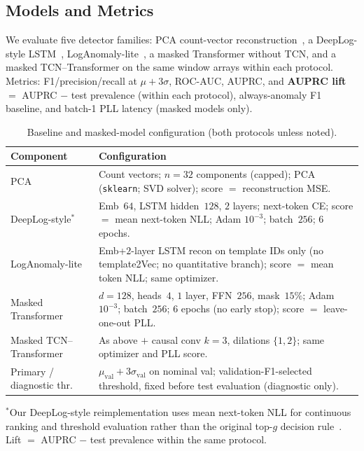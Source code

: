 \documentclass[a4paper]{llncs}
\renewcommand{\arraystretch}{0.95}
\begin{document}
\subsection{Models and Metrics}
We evaluate five detector families: PCA count-vector reconstruction~\cite{ref_pca}, a DeepLog-style LSTM~\cite{ref_deeplog}, LogAnomaly-lite~\cite{ref_loganomaly}, a masked Transformer without TCN, and a masked TCN--Transformer on the same window arrays within each protocol.
Metrics: F1/precision/recall at $\mu{+}3\sigma$, ROC-AUC, AUPRC, and \textbf{AUPRC lift} $=$ AUPRC $-$ test prevalence (within each protocol), always-anomaly F1 baseline, and batch-1 PLL latency (masked models only).

\begin{table}[!htbp]
\caption{Baseline and masked-model configuration (both protocols unless noted).}
\label{tab_baselines}
\centering
\setlength{\tabcolsep}{4pt}
\renewcommand{\arraystretch}{1.05}
\begin{tabular}{@{}>{\raggedright\arraybackslash}p{}
                >{\raggedright\arraybackslash}p{}@{}}
\toprule
\textbf{Component} & \textbf{Configuration} \\
\midrule
PCA & Count vectors; $n{=}32$ components (capped); PCA (\texttt{sklearn}; SVD solver); score $=$ reconstruction MSE. \\
DeepLog-style$^\ast$ & Emb~$64$, LSTM hidden~$128$, $2$ layers; next-token CE; score $=$ mean next-token NLL; Adam $10^{-3}$; batch~$256$; $6$ epochs. \\
LogAnomaly-lite & Emb+$2$-layer LSTM recon on template IDs only (no template2Vec; no quantitative branch); score $=$ mean token NLL; same optimizer. \\
Masked Transformer & $d{=}128$, heads~$4$, $1$ layer, FFN~$256$, mask~$15\%$; Adam $10^{-3}$; batch~$256$; $6$ epochs (no early stop); score $=$ leave-one-out PLL. \\
Masked TCN--Transformer & As above $+$ causal conv $k{=}3$, dilations $\{1,2\}$; same optimizer and PLL score. \\
Primary / diagnostic thr. & $\mu_{\mathrm{val}}{+}3\sigma_{\mathrm{val}}$ on nominal val; validation-F1-selected threshold, fixed before test evaluation (diagnostic only). \\
\bottomrule
\end{tabular}

\smallskip
{\footnotesize $^\ast$Our DeepLog-style reimplementation uses mean next-token NLL for continuous ranking and threshold evaluation rather than the original top-$g$ decision rule~\cite{ref_deeplog}. Lift $=$ AUPRC $-$ test prevalence within the same protocol.}
\end{table}
\end{document}
